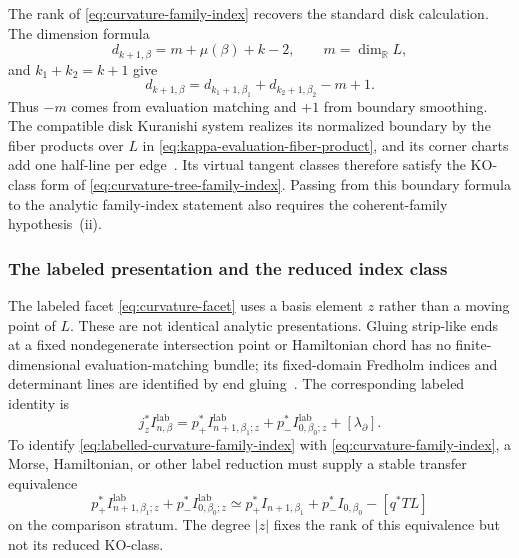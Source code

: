 \documentclass[11pt,letterpaper,twoside]{article}
\theoremstyle{plain}
\theoremstyle{definition}
\theoremstyle{remark}
\let\cite\citep
\begin{document}
The rank of \eqref{eq:curvature-family-index} recovers the standard disk calculation.  The dimension formula~\cite[Ch.~2]{fooo2009}
\[
 d_{k+1,\beta}=m+\mu(\beta)+k-2,
 \qquad m=\dim_{\mathbb R}L,
\]
and \(k_1+k_2=k+1\) give
\begin{equation}\label{eq:disk-node-rank}
 d_{k+1,\beta}
 =d_{k_1+1,\beta_1}+d_{k_2+1,\beta_2}-m+1.
\end{equation}
Thus \(-m\) comes from evaluation matching and \(+1\) from boundary smoothing.  The compatible disk Kuranishi system realizes its normalized boundary by the fiber products over \(L\) in \eqref{eq:kappa-evaluation-fiber-product}, and its corner charts add one half-line per edge~\cite{fooo2020}.  Its virtual tangent classes therefore satisfy the \(\mathrm{KO}\)-class form of \eqref{eq:curvature-tree-family-index}.  Passing from this boundary formula to the analytic family-index statement also requires the coherent-family hypothesis~\textup{(ii)}.

\subsubsection{The labeled presentation and the reduced index class}

The labeled facet \eqref{eq:curvature-facet} uses a basis element \(z\) rather than a moving point of \(L\).  These are not identical analytic presentations.  Gluing strip-like ends at a fixed nondegenerate intersection point or Hamiltonian chord has no finite-dimensional evaluation-matching bundle; its fixed-domain Fredholm indices and determinant lines are identified by end gluing~\cite{floerhofer1993,seidel2008,wehrheimwoodward2017orientations}.  The corresponding labeled identity is
\begin{equation}\label{eq:labelled-curvature-family-index}
 j_z^*I^{\mathrm{lab}}_{n,\beta}
 =p_+^*I^{\mathrm{lab}}_{n+1,\beta_1;z}
 +p_-^*I^{\mathrm{lab}}_{0,\beta_0;z}
 +[\lambda_\partial].
\end{equation}
To identify \eqref{eq:labelled-curvature-family-index} with \eqref{eq:curvature-family-index}, a Morse, Hamiltonian, or other label reduction must supply a stable transfer equivalence
\begin{equation}\label{eq:label-transfer}
 p_+^*I^{\mathrm{lab}}_{n+1,\beta_1;z}
 +p_-^*I^{\mathrm{lab}}_{0,\beta_0;z}
 \simeq
 p_+^*I_{n+1,\beta_1}
 +p_-^*I_{0,\beta_0}-[q^*TL]
\end{equation}
on the comparison stratum.  The degree \(|z|\) fixes the rank of this equivalence but not its reduced \(\mathrm{KO}\)-class.
\end{document}

